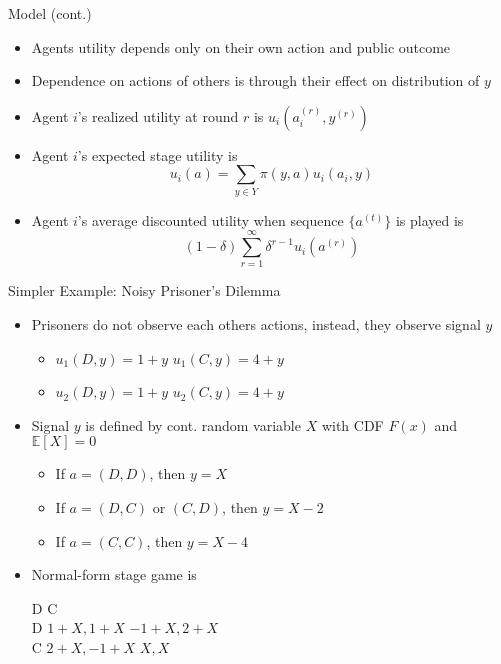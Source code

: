 \documentclass[11pt,aspectratio=169]{beamer}
\begin{document}
  \begin{frame}{Model (cont.)}
   \begin{itemize}[<+->]
    \item Agents utility depends \alert{only} on their own action and public outcome
    \item Dependence on actions of others is through their effect on distribution of $y$
    \item Agent $i$'s \alert{realized} utility at round $r$ is $u_i(a_i^{(r)}, y^{(r)})$
    \item Agent $i$'s expected stage utility is
    $$
    u_i(a) =\sum_{y\in Y}\pi(y,a)u_i(a_i,y) 
    $$
    \item Agent $i$'s average discounted utility when sequence $\{ a^{(t)}\}$ is played is
    $$
     (1 - \delta)\sum_{r=1}^{\infty}\delta^{r-1} u_i(a^{(r)}) 
    $$
   \end{itemize}
  \end{frame}
  
  
  \begin{frame}{Simpler Example: Noisy Prisoner's Dilemma}
   \begin{itemize}[<+->]
   \setlength{\itemsep}{0.5em}
    \item Prisoners do not observe each others actions, instead, they observe signal $y$
    \begin{itemize}
     \item $u_{1}(D, y) = 1 + y $   \hspace{1cm} $u_{1}(C, y) = 4 + y $ 
     \item $u_{2}(D, y) = 1 + y $   \hspace{1cm} $u_{2}(C, y) = 4 + y $ 
    \end{itemize}
    \item Signal $y$ is defined by cont. random variable $X$ with CDF $F(x)$ and $\mathbb{E}[X] = 0$
    \begin{itemize}
     \item If $a = (D, D)$, then $y = X$
     \item If $a = (D, C)$ or $(C, D)$, then $y = X - 2$
     \item If $a = (C, C)$, then $y = X - 4$ 
    \end{itemize}
    \item Normal-form stage game is
    \begin{center}\footnotesize
     \hspace{-6em}
     \begin{game}{2}{2}
      	\> D					\> C						\\
      D	\> $1 + X, 1 + X$	\> $ -1 + X, 2 + X$	\\
      C	\> $2 + X, -1 + X$	\> $ X, X$
     \end{game}
    \end{center}
   \end{itemize}
  \end{frame}
\end{document}
